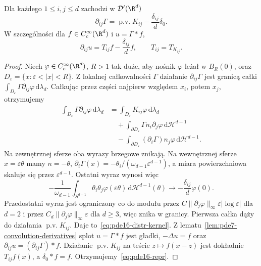 \begin{lemat}
\label{lem:pde16-distr-kernel}
Dla każdego $1\le i,j\le d$ zachodzi w $\mathcal D'(\R^d)$
\begin{equation}\label{eq:pde16-distr-kernel}
 \partial_{ij}\Gamma
 =\operatorname{p.v.}K_{ij}-\frac{\delta_{ij}}d\delta_0.
\end{equation}
W szczególności dla $f\in C_c^\infty(\R^d)$ i $u=\Gamma*f$,
\begin{equation}\label{eq:pde16-repr}
 \partial_{ij}u=T_{ij}f-\frac{\delta_{ij}}d f,
 \qquad T_{ij}=T_{K_{ij}}.
\end{equation}
\end{lemat}
\begin{proof}
Niech $\varphi\in C_c^\infty(\R^d)$, $R>1$ tak duże,
aby nośnik $\varphi$ leżał w $B_R(0)$, oraz
$D_\varepsilon=\{x:\varepsilon<|x|<R\}$.
Z lokalnej całkowalności $\Gamma$ działanie
$\partial_{ij}\Gamma$ jest granicą całki
$\int_{D_\varepsilon}\Gamma\partial_{ij}\varphi\,\mathrm d\lambda_d$.
Całkując przez części najpierw względem $x_i$, potem
$x_j$, otrzymujemy
\[
 \begin{aligned}
 \int_{D_\varepsilon}\Gamma\partial_{ij}\varphi\,\mathrm d\lambda_d
 &=\int_{D_\varepsilon}K_{ij}\varphi\,\mathrm d\lambda_d\\
 &\quad+\int_{\partial D_\varepsilon}
 \Gamma n_i\partial_j\varphi\,\mathrm d\mathcal H^{d-1}\\
 &\quad-\int_{\partial D_\varepsilon}
 (\partial_i\Gamma)n_j\varphi\,\mathrm d\mathcal H^{d-1}.
 \end{aligned}
\]
Na zewnętrznej sferze oba wyrazy brzegowe znikają.
Na wewnętrznej sferze $x=\varepsilon\theta$ mamy
$n=-\theta$, $\partial_i\Gamma(x)=
-\theta_i/(\omega_{d-1}\varepsilon^{d-1})$,
a miara powierzchniowa skaluje się przez
$\varepsilon^{d-1}$. Ostatni wyraz wynosi więc
\[
 -\frac1{\omega_{d-1}}\int_{S^{d-1}}\theta_i\theta_j
 \varphi(\varepsilon\theta)\,\mathrm d\mathcal H^{d-1}(\theta)
 \longrightarrow-\frac{\delta_{ij}}d\varphi(0).
\]
Przedostatni wyraz jest ograniczony co do modułu przez
$C\|\partial_j\varphi\|_\infty\varepsilon|\log\varepsilon|$
dla $d=2$ i przez $C_d\|\partial_j\varphi\|_\infty\varepsilon$
dla $d\ge3$, więc znika w granicy.
Pierwsza całka dąży do działania $\operatorname{p.v.}K_{ij}$.
Daje to~\eqref{eq:pde16-distr-kernel}.
Z lematu~\ref{lem:pde7-convolution-derivatives} splot
$u=\Gamma*f$ jest gładki, $-\Delta u=f$ oraz
$\partial_{ij}u=(\partial_{ij}\Gamma)*f$.
Działanie $\operatorname{p.v.}K_{ij}$ na teście
$z\mapsto f(x-z)$ jest dokładnie $T_{ij}f(x)$,
a $\delta_0*f=f$. Otrzymujemy~\eqref{eq:pde16-repr}.
\end{proof}


